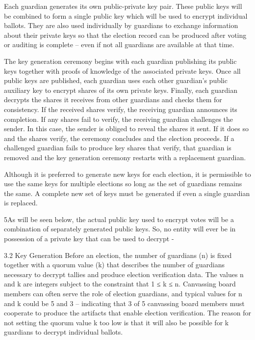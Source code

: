 Each guardian generates its own public-private key pair. These public keys will be combined to form a single public
key which will be used to encrypt individual ballots. They are also used individually by guardians to exchange
information about their private keys so that the election record can be produced after voting or auditing is
complete – even if not all guardians are available at that time.


The key generation ceremony begins with each guardian publishing its public keys together with proofs of knowledge
of the associated private keys. Once all public keys are published, each guardian uses each other guardian’s public
auxiliary key to encrypt shares of its own private keys. Finally, each guardian decrypts the shares it receives from
other guardians and checks them for consistency. If the received shares verify, the receiving guardian announces its
completion. If any shares fail to verify, the receiving guardian challenges the sender. In this case, the sender is
obliged to reveal the shares it sent. If it does so and the shares verify, the ceremony concludes and the election
proceeds. If a challenged guardian fails to produce key shares that verify, that guardian is removed and the key
generation ceremony restarts with a replacement guardian. \cite[2]{eg-spec}

Although it is preferred to generate new keys for each election, it is permissible to use the same
keys for multiple elections so long as the set of guardians remains the same. A complete new set of keys must
be generated if even a single guardian is replaced.\cite[3]{eg-spec}

5As will be seen below, the actual public key used to encrypt votes will be a combination of separately generated public
keys. So, no entity will ever be in possession of a private key that can be used to decrypt
-\cite[5]{eg-spec}

3.2 Key Generation Before an election, the number of guardians (n) is fixed together with a quorum value (k) that
describes the number of guardians necessary to decrypt tallies and produce election verification data. The values n and
k are integers subject to the constraint that 1 ≤ k ≤ n. Canvassing board members can often serve the role of election
guardians, and typical values for n and k could be 5 and 3 – indicating that 3 of 5 canvassing board members must
cooperate to produce the artifacts that enable election verification. The reason for not setting the quorum value k too
low is that it will also be possible for k guardians to decrypt individual ballots.
\cite[8]{eg-spec}

